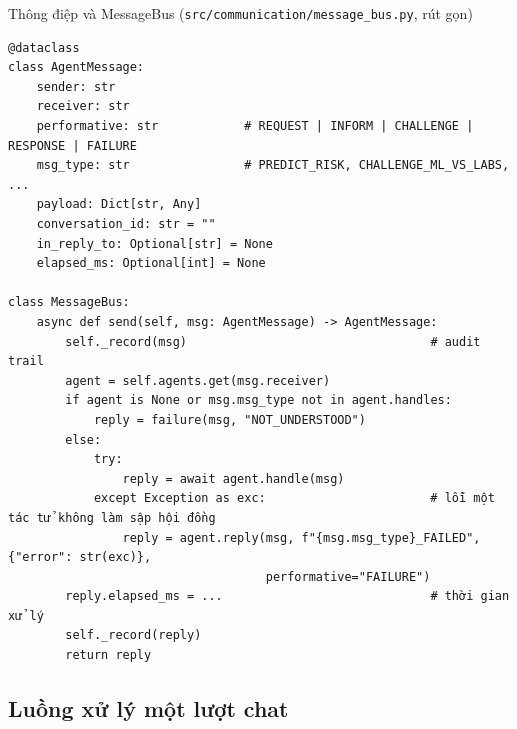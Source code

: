 \begin{code}{Thông điệp và MessageBus (\texttt{src/communication/message\_bus.py}, rút gọn)}
\label{lst:ch7-bus}
\begin{verbatim}
@dataclass
class AgentMessage:
    sender: str
    receiver: str
    performative: str            # REQUEST | INFORM | CHALLENGE | RESPONSE | FAILURE
    msg_type: str                # PREDICT_RISK, CHALLENGE_ML_VS_LABS, ...
    payload: Dict[str, Any]
    conversation_id: str = ""
    in_reply_to: Optional[str] = None
    elapsed_ms: Optional[int] = None

class MessageBus:
    async def send(self, msg: AgentMessage) -> AgentMessage:
        self._record(msg)                                  # audit trail
        agent = self.agents.get(msg.receiver)
        if agent is None or msg.msg_type not in agent.handles:
            reply = failure(msg, "NOT_UNDERSTOOD")
        else:
            try:
                reply = await agent.handle(msg)
            except Exception as exc:                       # lỗi một tác tử không làm sập hội đồng
                reply = agent.reply(msg, f"{msg.msg_type}_FAILED", {"error": str(exc)},
                                    performative="FAILURE")
        reply.elapsed_ms = ...                             # thời gian xử lý
        self._record(reply)
        return reply
\end{verbatim}
\end{code}

\subsection{Luồng xử lý một lượt chat}

